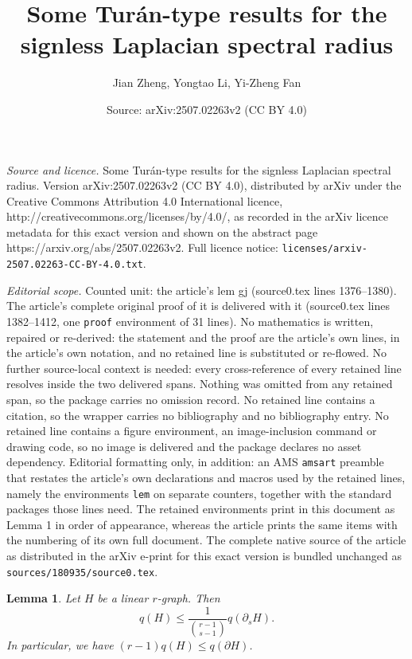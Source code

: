 \documentclass[10pt,a4paper]{amsart}
\title{Some Tur\'{a}n-type results for {the} signless Laplacian spectral radius}
\author{Jian Zheng, Yongtao Li, Yi-Zheng Fan}
\date{Source: arXiv:2507.02263v2 (CC BY 4.0)}
\newtheorem{lem}{Lemma}
\begin{document}
\maketitle

\noindent\emph{Source and licence.} Some Tur\'{a}n-type results for {the} signless Laplacian spectral radius. Version arXiv:2507.02263v2 (CC BY 4.0), distributed by arXiv under the Creative Commons Attribution 4.0 International licence, http://creativecommons.org/licenses/by/4.0/, as recorded in the arXiv licence metadata for this exact version and shown on the abstract page https://arxiv.org/abs/2507.02263v2. Full licence notice: \texttt{licenses/arxiv-2507.02263-CC-BY-4.0.txt}.\par\smallskip

\noindent\textit{Editorial scope.} Counted unit: the article's lem gj (source0.tex lines 1376--1380). The article's complete original proof of it is delivered with it (source0.tex lines 1382--1412, one \texttt{proof} environment of 31 lines). No mathematics is written, repaired or re-derived: the statement and the proof are the article's own lines, in the article's own notation, and no retained line is substituted or re-flowed.  No further source-local context is needed: every cross-reference of every retained line resolves inside the two delivered spans.  Nothing was omitted from any retained span, so the package carries no omission record.  No retained line contains a citation, so the wrapper carries no bibliography and no bibliography entry.  No retained line contains a figure environment, an image-inclusion command or drawing code, so no image is delivered and the package declares no asset dependency.  Editorial formatting only, in addition: an AMS \texttt{amsart} preamble that restates the article's own declarations and macros used by the retained lines, namely the environments \texttt{lem} on separate counters, together with the standard packages those lines need.  The retained environments print in this document as Lemma 1 in order of appearance, whereas the article prints the same items with the numbering of its own full document.  The complete native source of the article as distributed in the arXiv e-print for this exact version is bundled unchanged as \texttt{sources/180935/source0.tex}.
\begin{lem}\label{gj}
Let $H$ be a linear $r$-graph. Then
$$q(H)\leq\frac{1}{\binom{r-1}{s-1}}q(\partial_{s} H).$$
In particular, we have $(r-1)q(H)\leq q(\partial H)$.
\end{lem}
\end{document}
